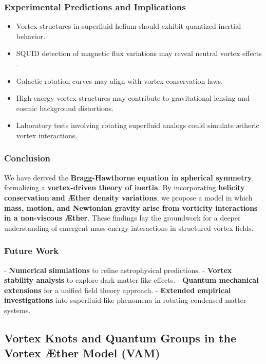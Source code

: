 \documentclass[a4paper,10pt]{article}
\begin{document}
\subsubsection*{Experimental Predictions and Implications}
\begin{itemize}
    \item Vortex structures in superfluid helium should exhibit quantized inertial behavior.
    \item SQUID detection of magnetic flux variations may reveal neutral vortex effects \cite{donnelly1991quantized}.
    \item Galactic rotation curves may align with vortex conservation laws.
    \item High-energy vortex structures may contribute to gravitational lensing and cosmic background distortions.
    \item Laboratory tests involving rotating superfluid analogs could simulate ætheric vortex interactions.
\end{itemize}

\subsubsection*{Conclusion}
We have derived the \textbf{Bragg-Hawthorne equation in spherical symmetry}, formalizing a \textbf{vortex-driven theory of inertia}. By incorporating \textbf{helicity conservation and Æther density variations}, we propose a model in which \textbf{mass, motion, and Newtonian gravity arise from vorticity interactions in a non-viscous Æther}. These findings lay the groundwork for a deeper understanding of emergent mass-energy interactions in structured vortex fields.

\subsubsection*{Future Work}
- \textbf{Numerical simulations} to refine astrophysical predictions.
- \textbf{Vortex stability analysis} to explore dark matter-like effects.
- \textbf{Quantum mechanical extensions} for a unified field theory approach.
- \textbf{Extended empirical investigations} into superfluid-like phenomena in rotating condensed matter systems.


\subsection{Vortex Knots and Quantum Groups in the Vortex Æther Model (VAM)}
\end{document}

